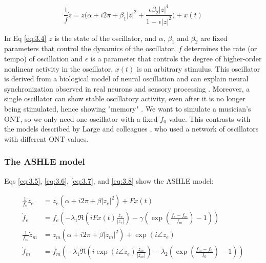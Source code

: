 \documentclass{report}
\begin{document}
\begin{equation}
\frac{1}{f}\dot{z} = z\bigg(\alpha + i2\pi + \beta_1|z|^2 + \frac{\epsilon\beta_2|z|^4}{1-\epsilon|z|^2}\bigg) + x(t) \label{eq:3.4}
\end{equation}

In Eq \eqref{eq:3.4} $z$ is the state of the oscillator, and $\alpha$, $\beta_1$ and $\beta_2$ are fixed parameters that control the dynamics of the oscillator. $f$ determines the rate (or tempo) of oscillation and $\epsilon$ is a parameter that controls the degree of higher-order nonlinear activity in the oscillator. $x(t)$ is an arbitrary stimulus. This oscillator is derived from a biological model of neural oscillation and can explain neural synchronization observed in real neurons and sensory processing \cite{lerud2019canonical, tal2017neural}. Moreover, a single oscillator can show stable oscillatory activity, even after it is no longer being stimulated, hence showing "memory" \cite{kim2015signal}. We want to simulate a musician's ONT, so we only need one oscillator with a fixed $f_0$ value. This contrasts with the models described by Large and colleagues \cite{large2010canonical}, who used a network of oscillators with different ONT values.

\subsubsection{The ASHLE model}

Eqs \eqref{eq:3.5}, \eqref{eq:3.6}, \eqref{eq:3.7}, and \eqref{eq:3.8} show the ASHLE model:

\begin{subequations}
\begin{align}
\frac{1}{f_e}\dot{z}_e &= z_e\left( \alpha + i2\pi + \beta|z_e|^2 \right) + Fx(t) \label{eq:3.5} \\
\dot{f}_e &= f_e \left(-\lambda_1\Re\left( iFx(t)\frac{\bar{z}_e}{|z_e|} \right) - \gamma\left( \exp\left(\frac{f_e-f_m}{f_m}\right)-1 \right) \right) \label{eq:3.6} \\
\frac{1}{f_m}\dot{z}_m &= z_m \left( \alpha + i2\pi + \beta|z_m|^2 \right) + \exp(i \angle z_e) \label{eq:3.7} \\
\dot{f}_m &= f_m \left( -\lambda_1\Re \left( i\exp(i \angle z_e)\frac{\bar{z}_m}{|z_m|} \right) - \lambda_2 \left( \exp\left(\frac{f_m-f_0}{f_0}\right)-1 \right) \right) \label{eq:3.8}
\end{align}
\end{subequations}
\end{document}
